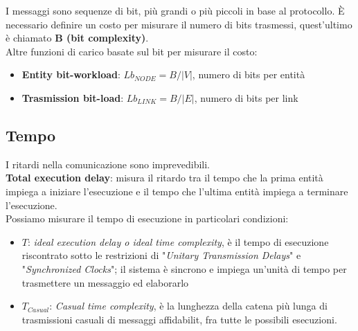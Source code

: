I messaggi sono sequenze di bit, più grandi o più piccoli in base al protocollo.
È necessario definire un costo per misurare il numero di bits trasmessi,
quest'ultimo è chiamato \textbf{B (bit complexity)}.\\
Altre funzioni di carico basate sul bit per misurare il costo:
\begin{itemize}
    \item \textbf{Entity bit-workload}: $Lb_{NODE} = B / |V|$, numero di bits per
          entità
    \item \textbf{Trasmission bit-load}: $Lb_{LINK} = B / |E|$, numero di bits per
          link
\end{itemize}

\subsection{Tempo}
I ritardi nella comunicazione sono imprevedibili.\\
\textbf{Total execution delay}: misura il ritardo tra il tempo che la prima
entità impiega a iniziare l'esecuzione e il tempo che l'ultima entità impiega a
terminare l'esecuzione.\\
Possiamo misurare il tempo di esecuzione in particolari condizioni:
\begin{itemize}
    \item \textbf{$T$}: \textit{ideal execution delay o ideal time complexity}, è
          il tempo di esecuzione riscontrato sotto le restrizioni di "\textit{Unitary
              Transmission Delays}" e "\textit{Synchronized Clocks}"; il sistema è sincrono
          e impiega un'unità di tempo per trasmettere un messaggio ed elaborarlo
    \item \textbf{$T_{Casual}$}: \textit{Casual time complexity}, è la lunghezza
          della catena più lunga di trasmissioni casuali di messaggi affidabilit, fra
          tutte le possibili esecuzioni.
\end{itemize}

